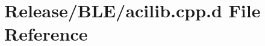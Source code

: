 \hypertarget{_release_2_b_l_e_2acilib_8cpp_8d}{\section{\-Release/\-B\-L\-E/acilib.cpp.\-d \-File \-Reference}
\label{_release_2_b_l_e_2acilib_8cpp_8d}
}
